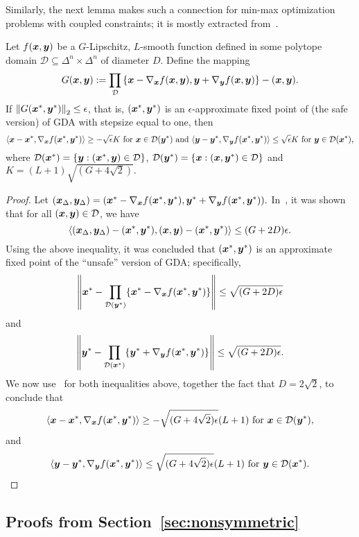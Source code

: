 Similarly, the next lemma makes such a connection for min-max optimization problems with coupled constraints; it is mostly extracted from~\citet[Section B.2]{DSZ21}.

\begin{lemma}\label{lem:safe} Let $f({\bm{x}},{\bm{y}})$ be a $G$-Lipschitz, $L$-smooth function defined in some polytope domain $\mathcal{D} \subseteq \Delta^n \times \Delta^n$ of diameter $D$. Define the mapping 
\[G({\bm{x}},{\bm{y}}) := \prod_{\mathcal{D}}
\left\{{\bm{x}}-\nabla_{{\bm{x}}}f({\bm{x}},{\bm{y}}),{\bm{y}}+\nabla_{{\bm{y}}}f({\bm{x}},{\bm{y}})\right\}-({\bm{x}},{\bm{y}}).\]
If $\left\| G({\bm{x}}^*,{\bm{y}}^*) \right\|_2 \leq \epsilon$, that is, $({\bm{x}}^*,{\bm{y}}^*)$ is an $\epsilon$-approximate fixed point of (the safe version) of GDA with stepsize equal to one, then 
\[
\langle {\bm{x}}-{\bm{x}}^*,\nabla_{{\bm{x}}}f({\bm{x}}^*,{\bm{y}}^*)\rangle
\geq  -\sqrt{\epsilon}K \textrm { for }{\bm{x}} \in \mathcal{D}({\bm{y}}^*) \textrm{ and }\langle {\bm{y}}-{\bm{y}}^*,\nabla_{{\bm{y}}}f({\bm{x}}^*,{\bm{y}}^*)\rangle
\leq  \sqrt{\epsilon}K \textrm { for }{\bm{y}} \in \mathcal{D}({\bm{x}}^*),
\]
where $\mathcal{D}({\bm{x}}^*) = \{{\bm{y}}:({\bm{x}}^*,{\bm{y}})\in\mathcal{D}\}$, 
$\mathcal{D}({\bm{y}}^*) = \{{\bm{x}}:({\bm{x}},{\bm{y}}^*)\in\mathcal{D}\}$ and $K = (L+1)\sqrt{(G+4\sqrt{2})}.$
\end{lemma}
\begin{proof}
Let 
$({\bm{x}}_{\Delta},{\bm{y}}_{\Delta}) = ({\bm{x}}^*-\nabla_{{\bm{x}}}f({\bm{x}}^*,{\bm{y}}^*),{\bm{y}}^*+\nabla_{{\bm{y}}}f({\bm{x}}^*,{\bm{y}}^*)).$ 
In~\citet[Claim B.2]{DSZ21}, it was shown that for all $({\bm{x}},{\bm{y}})\in \mathcal{D}$, we have
\[\langle({\bm{x}}_{\Delta},{\bm{y}}_{\Delta})-({\bm{x}}^*,{\bm{y}}^*),({\bm{x}},{\bm{y}})-({\bm{x}}^*,{\bm{y}}^*)\rangle\leq (G+2D)\epsilon.\]
Using the above inequality, it was concluded that  $({\bm{x}}^*,{\bm{y}}^*)$ is an approximate fixed point of the ``unsafe'' version of GDA; specifically,
\[
\left\|{\bm{x}}^* - \prod_{\mathcal{D}({\bm{y}}^*)}\{{\bm{x}}^* - \nabla_{{\bm{x}}}f({\bm{x}}^*,{\bm{y}}^*)\}\right\|
\leq \sqrt{(G+2D)\epsilon}
\]
and
\[
\left\|{\bm{y}}^* - \prod_{\mathcal{D}({\bm{x}}^*)}\{{\bm{y}}^* + \nabla_{{\bm{y}}}f({\bm{x}}^*,{\bm{y}}^*)\}\right\|
\leq \sqrt{(G+2D)\epsilon}.
\]
We now use~ for both inequalities above, together the fact that $D = 2\sqrt{2}$, to conclude that
\[
\langle {\bm{x}}-{\bm{x}}^*,\nabla_{{\bm{x}}}f({\bm{x}}^*,{\bm{y}}^*)\rangle
\geq  -\sqrt{(G+4\sqrt{2})\epsilon}(L+1) \textrm { for }{\bm{x}} \in \mathcal{D}({\bm{y}}^*),\]  and \[\langle {\bm{y}}-{\bm{y}}^*,\nabla_{{\bm{y}}}f({\bm{x}}^*,{\bm{y}}^*)\rangle
\leq  \sqrt{(G+4\sqrt{2})\epsilon}(L+1) \textrm { for }{\bm{y}} \in \mathcal{D}({\bm{x}}^*).
\]
\end{proof}

\subsection{Proofs from Section~\ref{sec:nonsymmetric}}
\label{sec:proofs3}


